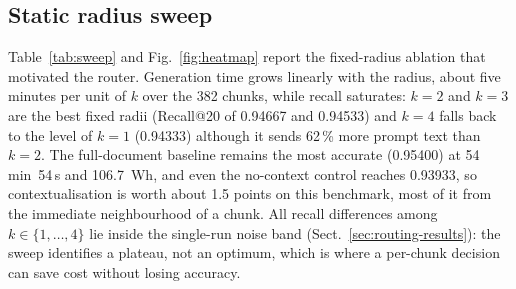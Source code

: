 \documentclass[pdflatex,sn-mathphys-num]{sn-jnl}
\makeatletter
\newif\ifprovenance
\newcommand{\verify}[1]{\ifprovenance\textcolor{red}{{\footnotesize [VERIFY: #1]}}\fi}
\newcommand{\Rec}[1]{Recall@#1}
\theoremstyle{thmstyleone}%
\theoremstyle{thmstylethree}%
\makeatother
\begin{document}
\subsection{Static radius sweep}\label{sec:static}

Table~\ref{tab:sweep} and Fig.~\ref{fig:heatmap} report the fixed-radius ablation that motivated the router. Generation time grows linearly with the radius, about five minutes per unit of $k$ over the 382 chunks, while recall saturates: $k=2$ and $k=3$ are the best fixed radii (\Rec{20} of 0.94667 and 0.94533) and $k=4$ falls back to the level of $k=1$ (0.94333) although it sends 62\,\% more prompt text than $k=2$.\verify{times: the ``k=0 \ldots k=4'' comment block in cell~1 of \texttt{RnD/ablation\_doc\_slice\_generation.ipynb} (wall-clock of the generation loop, no tracker); recall values: ``METRICS AT N=20'' blocks of \texttt{RnD/ablation\_doc\_slice\_retrieval.ipynb} for the tables \texttt{ablation\_doc\_slice\_radius\_0..4}; prompt-text ratio $10\,320\,971/6\,360\,511=1.62$ from the \texttt{cost.py} re-implementation} The full-document baseline remains the most accurate (0.95400) at 54\,min~54\,s and 106.7\, Wh, and even the no-context control reaches 0.93933, so contextualisation is worth about 1.5 points on this benchmark, most of it from the immediate neighbourhood of a chunk. All recall differences among $k\in\{1,\dots,4\}$ lie inside the single-run noise band (Sect.~\ref{sec:routing-results}): the sweep identifies a plateau, not an optimum, which is where a per-chunk decision can save cost without losing accuracy.
\end{document}
